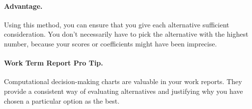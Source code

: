 \paragraph{Advantage.} Using this method, you can ensure that you give
each alternative sufficient consideration. You don't necessarily have to
pick the alternative with the highest number, because your scores or
coefficients might have been imprecise.

\paragraph{Work Term Report Pro Tip.} Computational decision-making charts are valuable in your work reports. They provide a consistent way of evaluating alternatives and justifying why you have chosen a particular option as the best.



